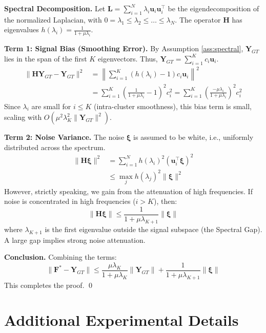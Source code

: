 \documentclass{article}
\theoremstyle{plain}
\theoremstyle{definition}
\theoremstyle{remark}
\newcommand{\Lap}{\mathbf{L}}      %
\newcommand{\F}{\mathbf{F}}        %
\newcommand{\Y}{\mathbf{Y}}        %
\begin{document}
\textbf{Spectral Decomposition.}
Let $\Lap = \sum_{i=1}^N \lambda_i \mathbf{u}_i \mathbf{u}_i^\top$ be the eigendecomposition of the normalized Laplacian, with $0 = \lambda_1 \le \lambda_2 \le \dots \le \lambda_N$.
The operator $\mathbf{H}$ has eigenvalues $h(\lambda_i) = \frac{1}{1 + \mu \lambda_i}$.

\textbf{Term 1: Signal Bias (Smoothing Error).}
By Assumption \ref{ass:spectral}, $\Y_{GT}$ lies in the span of the first $K$ eigenvectors. Thus, $\Y_{GT} = \sum_{i=1}^K c_i \mathbf{u}_i$.
\begin{align}
    \|\mathbf{H} \Y_{GT} - \Y_{GT}\|^2 &= \left\| \sum_{i=1}^K (h(\lambda_i) - 1) c_i \mathbf{u}_i \right\|^2 \\
    &= \sum_{i=1}^K \left( \frac{1}{1+\mu\lambda_i} - 1 \right)^2 c_i^2 = \sum_{i=1}^K \left( \frac{-\mu\lambda_i}{1+\mu\lambda_i} \right)^2 c_i^2
\end{align}
Since $\lambda_i$ are small for $i \le K$ (intra-cluster smoothness), this bias term is small, scaling with $O(\mu^2 \lambda_K^2 \|\Y_{GT}\|^2)$.

\textbf{Term 2: Noise Variance.}
The noise $\boldsymbol{\xi}$ is assumed to be white, i.e., uniformly distributed across the spectrum.
\begin{align}
    \|\mathbf{H} \boldsymbol{\xi}\|^2 &= \sum_{i=1}^N h(\lambda_i)^2 (\mathbf{u}_i^\top \boldsymbol{\xi})^2 \\
    &\le \max_{j} h(\lambda_j)^2 \|\boldsymbol{\xi}\|^2
\end{align}
However, strictly speaking, we gain from the attenuation of high frequencies. If noise is concentrated in high frequencies ($i > K$), then:
\begin{equation}
    \|\mathbf{H} \boldsymbol{\xi}\| \le \frac{1}{1 + \mu \lambda_{K+1}} \|\boldsymbol{\xi}\|
\end{equation}
where $\lambda_{K+1}$ is the first eigenvalue outside the signal subspace (the Spectral Gap). A large gap implies strong noise attenuation.

\textbf{Conclusion.}
Combining the terms:
\begin{equation}
    \|\F^* - \Y_{GT}\| \le \frac{\mu \lambda_K}{1+\mu \lambda_K}\|\Y_{GT}\| + \frac{1}{1+\mu \lambda_{K+1}} \|\boldsymbol{\xi}\|
\end{equation}
This completes the proof. \qed

\section{Additional Experimental Details}
\label{app:details}
\end{document}
